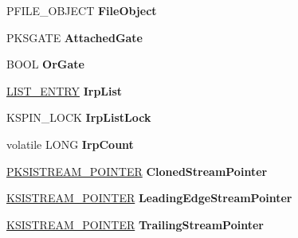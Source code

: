 \begin{DoxyCompactItemize}
\item 
\mbox{\label{struct_i_ks_pin_impl_a56f0fd11658b6f1f223d4445e6b4d765}} 
P\+F\+I\+L\+E\+\_\+\+O\+B\+J\+E\+CT {\bfseries File\+Object}
\item 
\mbox{\label{struct_i_ks_pin_impl_a54ea60326ccad02dd81b04d3fe29cec3}} 
P\+K\+S\+G\+A\+TE {\bfseries Attached\+Gate}
\item 
\mbox{\label{struct_i_ks_pin_impl_a0774d08726fd37978b8af8a764bdcb0d}} 
B\+O\+OL {\bfseries Or\+Gate}
\item 
\mbox{\label{struct_i_ks_pin_impl_a2762bcfe682460fb6a9834119c0f4f7f}} 
\hyperlink{struct___l_i_s_t___e_n_t_r_y}{L\+I\+S\+T\+\_\+\+E\+N\+T\+RY} {\bfseries Irp\+List}
\item 
\mbox{\label{struct_i_ks_pin_impl_a78954a72e48789a22e206a7ffa52181b}} 
K\+S\+P\+I\+N\+\_\+\+L\+O\+CK {\bfseries Irp\+List\+Lock}
\item 
\mbox{\label{struct_i_ks_pin_impl_a3f8cc116d1127d218ae192a689520ad5}} 
volatile L\+O\+NG {\bfseries Irp\+Count}
\item 
\mbox{\label{struct_i_ks_pin_impl_a0dd7e30da0121ff7788da9efa9093640}} 
\hyperlink{struct___k_s_i_s_t_r_e_a_m___p_o_i_n_t_e_r}{P\+K\+S\+I\+S\+T\+R\+E\+A\+M\+\_\+\+P\+O\+I\+N\+T\+ER} {\bfseries Cloned\+Stream\+Pointer}
\item 
\mbox{\label{struct_i_ks_pin_impl_acc254fc2c4ad7a7cb4accc66dc854552}} 
\hyperlink{struct___k_s_i_s_t_r_e_a_m___p_o_i_n_t_e_r}{K\+S\+I\+S\+T\+R\+E\+A\+M\+\_\+\+P\+O\+I\+N\+T\+ER} {\bfseries Leading\+Edge\+Stream\+Pointer}
\item 
\mbox{\label{struct_i_ks_pin_impl_a20c5f9937364d5088b29bfdd4741340e}} 
\hyperlink{struct___k_s_i_s_t_r_e_a_m___p_o_i_n_t_e_r}{K\+S\+I\+S\+T\+R\+E\+A\+M\+\_\+\+P\+O\+I\+N\+T\+ER} {\bfseries Trailing\+Stream\+Pointer}
\item 
\mbox{\label{struct_i_ks_pin_impl_ab430cc6a55098946823c5ee28b2ee7c9}} 

\end{DoxyCompactItemize}
